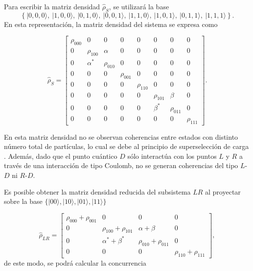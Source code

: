 \begin{appendixs}
Para escribir la matriz densidad $\hat{\rho}_{S}$, se utilizará la base  
\[
\left\{ |0,0,0\rangle,\ |1,0,0\rangle,\ |0,1,0\rangle,\ |0,0,1\rangle,\ |1,1,0\rangle,\ |1,0,1\rangle,\ |0,1,1\rangle,\ |1,1,1\rangle \right\}.
\]
En esta representación, la matriz densidad del sistema se expresa como

\begin{equation}
    \hat{\rho}_{S} = 
    \begin{bmatrix}
        \rho_{000} & 0 & 0 & 0 & 0 & 0 & 0 & 0 \\
        0 & \rho_{100} & \alpha & 0 & 0 & 0 & 0 & 0 \\
        0 & \alpha^{*} & \rho_{010} & 0 & 0 & 0 & 0 & 0 \\
        0 & 0 & 0 & \rho_{001} & 0 & 0 & 0 & 0 \\
        0 & 0 & 0 & 0 & \rho_{110} & 0 & 0 & 0 \\
        0 & 0 & 0 & 0 & 0 & \rho_{101} & \beta & 0 \\
        0 & 0 & 0 & 0 & 0 & \beta^{*} & \rho_{011} & 0 \\
        0 & 0 & 0 & 0 & 0 & 0 & 0 & \rho_{111} 
        \end{bmatrix}.
        \label{appendix5rhoconcu}
\end{equation}

En esta matriz densidad no se observan coherencias entre estados con distinto número total de partículas, lo cual se debe al principio de superselección de carga \cite{bartlett2007reference,wick1997intrinsic}. Además, dado que el punto cuántico $D$ sólo interactúa con los puntos $L$ y $R$ a través de una interacción de tipo Coulomb, no se generan coherencias del tipo $L$-$D$ ni $R$-$D$. 

Es posible obtener la matriz densidad reducida del subsistema $LR$ al proyectar sobre la base  $\{|00\rangle, |10\rangle, |01\rangle, |11\rangle\}$

\begin{equation*}
    \hat{\rho}_{LR} = 
    \begin{bmatrix}
        \rho_{000}+\rho_{001} & 0 & 0 & 0  \\
        0 & \rho_{100} + \rho_{101} & \alpha + \beta & 0  \\
        0 & \alpha^{*} +\beta^{*} & \rho_{010} + \rho_{011} & 0  \\
        0 & 0 & 0 & \rho_{110} + \rho_{111} 
        \end{bmatrix},
\end{equation*}
de este modo, se podrá calcular la concurrencia 


\end{appendixs}

